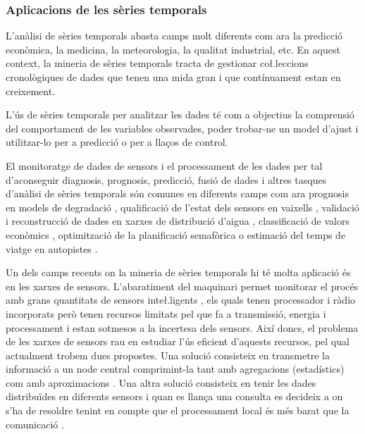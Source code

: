 \subsubsection{Aplicacions de les sèries temporals}

L'anàlisi de sèries temporals abasta camps molt diferents com ara la predicció econòmica, la medicina, la meteorologia, la qualitat industrial, etc. En aquest context,  la mineria de sèries temporals tracta de gestionar co\l.leccions cronològiques de dades que tenen una mida gran i que contínuament estan en creixement.


L'ús de sèries temporals per analitzar les dades té com a objectius la comprensió del comportament de les variables observades, poder trobar-ne un model d'ajust i utilitzar-lo per a predicció o per a llaços de control.


El monitoratge de dades de sensors i el processament de les dades per tal d'aconseguir diagnosis, prognosis, predicció, fusió de dades i altres tasques d'anàlisi de sèries temporals són comunes en diferents camps com ara prognosis en models de degradació \parencite{yu11}, qualificació de l'estat dels sensors en vaixells \parencite{palmer07}, validació i reconstrucció de dades en xarxes de distribució d'aigua \parencite{quevedo10}, classificació de valors econòmics \parencite{dreyer95}, optimització de la planificació semafòrica \parencite{last11} o estimació del temps de viatge en autopistes \parencite{soriguera10}.



Un dels camps recents on la mineria de sèries temporals hi té molta aplicació és en les xarxes de sensors. L'abaratiment del maquinari permet monitorar el procés amb grans quantitats de sensors inte\l.ligents \parencite{jainagrawal05,yaogehrke02}, els quals tenen processador i ràdio incorporats però tenen recursos limitats pel que fa a transmissió, energia i processament i estan sotmesos a la incertesa dels sensors. Així doncs, el problema  de les xarxes de sensors rau en estudiar l'ús eficient d'aquests recursos, pel qual actualment trobem dues propostes.
Una solució consisteix en transmetre la informació a un node central comprimint-la tant amb agregacions (estadístics) com amb aproximacions \parencite{deligiannakis07}.
Una altra solució consisteix en tenir les dades distribuïdes en diferents sensors i quan es llança una consulta es decideix a on s'ha de resoldre tenint en compte que el processament local és més barat que la comunicació \parencite{yaogehrke02,gehrkemadden04,bonnet01}. 


